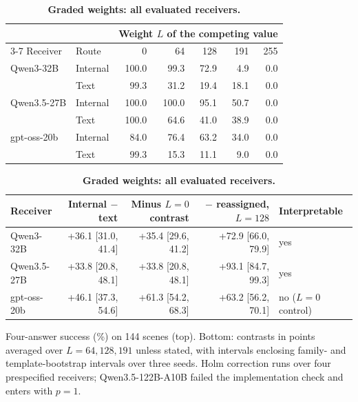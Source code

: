 \begin{table}[!htbp]
\caption{\textbf{Graded weights: all evaluated receivers.}}
\label{tab:graded_full}
\centering\small
\begin{tabular*}{\linewidth}{@{\extracolsep{\fill}}llrrrrr@{}}
\toprule
 & & \multicolumn{5}{c}{Weight $L$ of the competing value} \\\cmidrule(l){3-7}
Receiver & Route & 0 & 64 & 128 & 191 & 255 \\
\midrule
Qwen3-32B & Internal & 100.0 & 99.3 & 72.9 & 4.9 & 0.0 \\
 & Text & 99.3 & 31.2 & 19.4 & 18.1 & 0.0 \\
Qwen3.5-27B & Internal & 100.0 & 100.0 & 95.1 & 50.7 & 0.0 \\
 & Text & 100.0 & 64.6 & 41.0 & 38.9 & 0.0 \\
gpt-oss-20b & Internal & 84.0 & 76.4 & 63.2 & 34.0 & 0.0 \\
 & Text & 99.3 & 15.3 & 11.1 & 9.0 & 0.0 \\
\bottomrule
\end{tabular*}
\par\vspace{6pt}
{\footnotesize\setlength{\tabcolsep}{3pt}
\begin{tabular*}{\linewidth}{@{\extracolsep{\fill}}lrrrl@{}}
\toprule
Receiver & Internal $-$ text & Minus $L=0$ contrast & $-$ reassigned, $L=128$ & Interpretable \\
\midrule
Qwen3-32B & +36.1 [31.0, 41.4] & +35.4 [29.6, 41.2] & +72.9 [66.0, 79.9] & yes \\
Qwen3.5-27B & +33.8 [20.8, 48.1] & +33.8 [20.8, 48.1] & +93.1 [84.7, 99.3] & yes \\
gpt-oss-20b & +46.1 [37.3, 54.6] & +61.3 [54.2, 68.3] & +63.2 [56.2, 70.1] & no ($L=0$ control) \\
\bottomrule
\end{tabular*}}
\par\vspace{3pt}
{\footnotesize\raggedright Four-answer success (\%) on 144 scenes (top). Bottom: contrasts in points averaged over $L=64,128,191$ unless stated, with intervals enclosing family- and template-bootstrap intervals over three seeds. Holm correction runs over four prespecified receivers; Qwen3.5-122B-A10B failed the implementation check and enters with $p=1$.\par}
\end{table}
